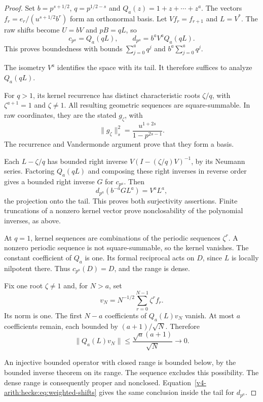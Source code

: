 \begin{proof}
Set $b=p^{s+1/2}$, $q=p^{1/2-s}$ and $Q_a(z)=1+z+\cdots+z^a$.
The vectors $f_r=e_r/(u^{s+1/2}b^r)$ form an orthonormal basis.
Let $Vf_r=f_{r+1}$ and $L=V^*$.
The raw shifts become $U=bV$ and $pB=qL$, so
\begin{equation}
 \label{v4-arith:hecke:eq:weighted-shifts}
 c_{p^a}=Q_a(qL),\qquad d_{p^a}=b^aV^aQ_a(qL).
\end{equation}
This proves boundedness with bounds $\sum_{j=0}^aq^j$
and $b^a\sum_{j=0}^aq^j$.

The isometry $V^a$ identifies the space with its tail.
It therefore suffices to analyze $Q_a(qL)$.

For $q>1$, its kernel recurrence has distinct characteristic roots
$\zeta/q$, with $\zeta^{a+1}=1$ and $\zeta\ne1$.
All resulting geometric sequences are square-summable.
In raw coordinates, they are the stated $g_\zeta$, with
\[
 \|g_\zeta\|_s^2=\frac{u^{1+2s}}{1-p^{2s-1}}.
\]
The recurrence and Vandermonde argument prove that they form a basis.

Each $L-\zeta/q$ has bounded right inverse
$V(I-(\zeta/q)V)^{-1}$, by its Neumann series.
Factoring $Q_a(qL)$ and composing these right inverses in reverse
order gives a bounded right inverse $G$ for $c_{p^a}$.
Then
\[
 d_{p^a}(b^{-a}GL^a)=V^aL^a,
\]
the projection onto the tail.
This proves both surjectivity assertions.
Finite truncations of a nonzero kernel vector prove nonclosability
of the polynomial inverses, as above.

At $q=1$, kernel sequences are combinations of the periodic
sequences $\zeta^r$.
A nonzero periodic sequence is not square-summable, so the kernel vanishes.
The constant coefficient of $Q_a$ is one.
Its formal reciprocal acts on $D$, since $L$ is locally nilpotent there.
Thus $c_{p^a}(D)=D$, and the range is dense.

Fix one root $\zeta\ne1$ and, for $N>a$, set
\[
 v_N=N^{-1/2}\sum_{r=0}^{N-1}\zeta^rf_r.
\]
Its norm is one.
The first $N-a$ coefficients of $Q_a(L)v_N$ vanish.
At most $a$ coefficients remain, each bounded by $(a+1)/\sqrt N$.
Therefore
\[
 \|Q_a(L)v_N\|\leq\frac{\sqrt a(a+1)}{\sqrt N}\longrightarrow0.
\]

An injective bounded operator with closed range is bounded below,
by the bounded inverse theorem on its range.
The sequence excludes this possibility.
The dense range is consequently proper and nonclosed.
Equation~\eqref{v4-arith:hecke:eq:weighted-shifts} gives the same
conclusion inside the tail for $d_{p^a}$.


\end{proof}
